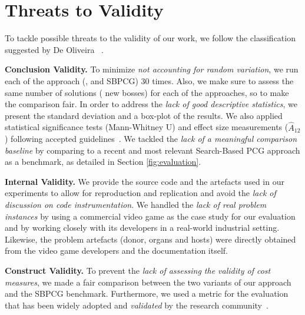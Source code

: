 \section{Threats to Validity}
\label{sec:Threats}

To tackle possible threats to the validity of our work, we follow the classification suggested by De Oliveira \etal~\cite{oliveira2011threats}.

\noindent \textbf{Conclusion Validity.}
To minimize \textit{not accounting for random variation}, we run each of the approach (\ie \simhotep, \timhotep and SBPCG) 30 times. Also, we make sure to assess the same number of solutions ( new bosses) for each of the approaches, so to make the comparison fair. In order to address the \textit{lack of good descriptive statistics}, we present the standard deviation and a box-plot of the results. We also applied statistical significance tests (Mann-Whitney U) and effect size measurements ($\hat{A}_{12}$) following accepted guidelines~\cite{arcuri2013parameter}. We tackled the \textit{lack of a meaningful comparison baseline} by comparing \ApproachName{} to a recent and most relevant Search-Based PCG approach as a benchmark, as detailed in Section \ref{fig:evaluation}. 

\noindent \textbf{Internal Validity.}
We provide the source code and the artefacts used in our experiments to allow for reproduction and replication and avoid the \textit{lack of discussion on code instrumentation}.
We handled the \textit{lack of real problem instances} by using a commercial video game as the case study for our evaluation and by working closely with its developers in a real-world industrial setting. 
Likewise, the problem artefacts (donor, organs and hosts) were directly obtained from the video game developers and the documentation itself. 

\noindent \textbf{Construct Validity.}
To prevent the \textit{lack of assessing the validity of cost measures}, we made a fair comparison between the two variants of our approach and the SBPCG benchmark. Furthermore, we used a metric for the evaluation that has been widely adopted and \textit{validated} by the research community~\cite{browne2010evolutionary}.

